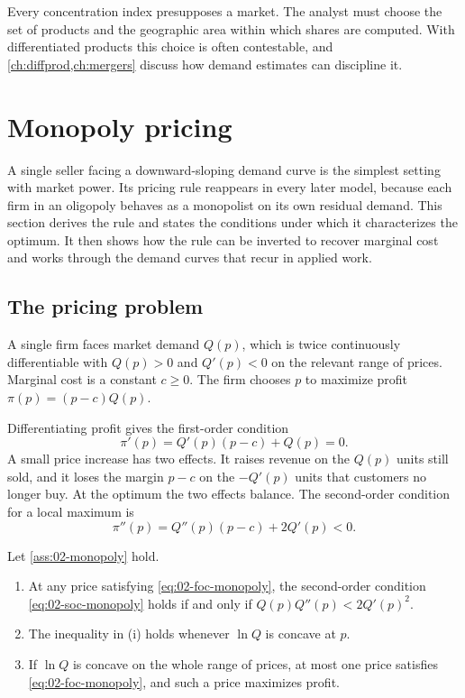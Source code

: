 Every concentration index presupposes a market. The analyst must choose the set of products and the geographic
area within which shares are computed. With differentiated products this choice is often contestable, and
\cref{ch:diffprod,ch:mergers} discuss how demand estimates can discipline it.

\section{Monopoly pricing}\label{sec:02-monopoly}

A single seller facing a downward-sloping demand curve is the simplest setting with market power. Its pricing rule
reappears in every later model, because each firm in an oligopoly behaves as a monopolist on its own residual
demand. This section derives the rule and states the conditions under which it characterizes the optimum. It then
shows how the rule can be inverted to recover marginal cost and works through the demand curves that recur in
applied work.

\subsection{The pricing problem}\label{sec:02-monopoly-foc}

\begin{assumption}[Monopoly]\label{ass:02-monopoly}
A single firm faces market demand $Q(p)$, which is twice continuously differentiable with $Q(p) > 0$ and
$Q'(p) < 0$ on the relevant range of prices. Marginal cost is a constant $c \ge 0$. The firm chooses $p$ to maximize
profit $\pi(p) = (p - c)Q(p)$.
\end{assumption}

Differentiating profit gives the first-order condition
\begin{equation}\label{eq:02-foc-monopoly}
  \pi'(p) = Q'(p)(p - c) + Q(p) = 0 .
\end{equation}
A small price increase has two effects. It raises revenue on the $Q(p)$ units still sold, and it loses the margin
$p - c$ on the $-Q'(p)$ units that customers no longer buy. At the optimum the two effects balance. The
second-order condition for a local maximum is
\begin{equation}\label{eq:02-soc-monopoly}
  \pi''(p) = Q''(p)(p - c) + 2Q'(p) < 0 .
\end{equation}

\begin{lemma}\label{lem:02-soc}
Let \cref{ass:02-monopoly} hold.
\begin{enumerate}[label=(\roman*)]
  \item At any price satisfying \eqref{eq:02-foc-monopoly}, the second-order condition \eqref{eq:02-soc-monopoly}
  holds if and only if $Q(p)Q''(p) < 2Q'(p)^2$.
  \item The inequality in (i) holds whenever $\ln Q$ is concave at $p$.
  \item If $\ln Q$ is concave on the whole range of prices, at most one price satisfies
  \eqref{eq:02-foc-monopoly}, and such a price maximizes profit.
\end{enumerate}
\end{lemma}

